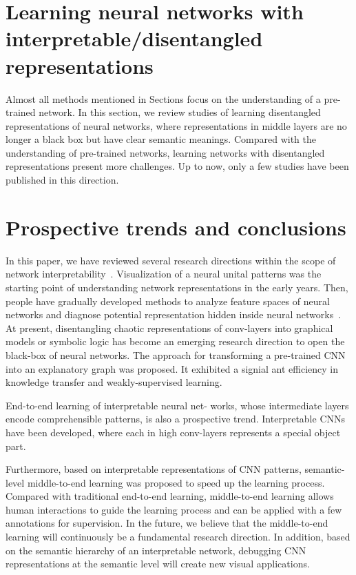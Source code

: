 \documentclass[10pt,twocolumn,letterpaper]{article}
\begin{document}
\section{Learning neural networks with interpretable/disentangled representations}
Almost all methods mentioned in Sections focus on the understanding of a pre-trained network. In this section, we review studies of learning disentangled representations of neural networks, where representations in middle layers are no longer a black box but have clear semantic meanings. Compared with the understanding of pre-trained networks, learning networks with disentangled representations present more challenges. Up to now, only a few studies have been published in this direction.

\section{Prospective trends and conclusions}

In this paper, we have reviewed several research directions within the scope of network interpretability~\cite{krizhevsky2012imagenet}. Visualization of a neural unital patterns was  the starting point of understanding network representations in the early years. Then, people have gradually developed methods to analyze feature spaces of neural networks and diagnose potential representation  hidden inside neural networks~\cite{Ouyang2014Joint}. At present, disentangling chaotic representations of conv-layers into graphical models or symbolic logic has become an emerging research direction to open the black-box of neural networks. The approach for transforming a pre-trained CNN into an explanatory graph was proposed. It exhibited a signial ant efficiency in knowledge transfer and weakly-supervised learning.


End-to-end learning of interpretable neural net- works, whose intermediate layers encode comprehensible patterns, is also a prospective trend. Interpretable CNNs have been developed, where each in high conv-layers represents a special object part.


Furthermore, based on interpretable representations of CNN patterns, semantic-level middle-to-end learning was proposed to speed up the learning process. Compared with traditional end-to-end learning, middle-to-end learning allows human interactions to guide the learning process and can be applied with a few annotations for supervision.
In the future, we believe that the middle-to-end learning will continuously be a fundamental research direction. In addition, based on the semantic hierarchy of an interpretable network, debugging CNN representations at the semantic level will create new visual applications.
{\small


}
\end{document}
